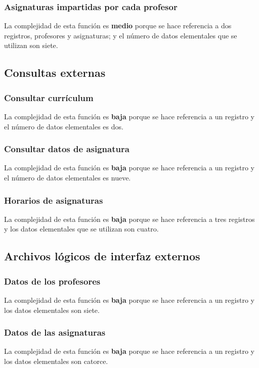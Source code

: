 \documentclass[11pt,a4paper,spanish,twoside]{book}
\begin{document}
\subsubsection{Asignaturas impartidas por cada profesor}
La complejidad de esta función es \textbf{medio} porque se hace referencia a
dos registros, profesores y asignaturas; y el número de datos elementales que se
utilizan son siete. 

\subsection{Consultas externas}
\subsubsection{Consultar currículum}
La complejidad de esta función es \textbf{baja} porque se hace referencia a
un registro y el número de datos elementales es dos.

\subsubsection{Consultar datos de asignatura} 
La complejidad de esta función es \textbf{baja} porque se hace referencia a
un registro y el número de datos elementales es nueve.

\subsubsection{Horarios de asignaturas}
La complejidad de esta función es \textbf{baja} porque se hace referencia a
tres registros y los datos elementales que se utilizan son cuatro.

\subsection{Archivos lógicos de interfaz externos}
\subsubsection{Datos de los profesores}
La complejidad de esta función es \textbf{baja} porque se hace referencia a
un registro y los datos elementales son siete.

\subsubsection{Datos de las asignaturas}
La complejidad de esta función es \textbf{baja} porque se hace referencia a
un registro y los datos elementales son catorce.
\end{document}
